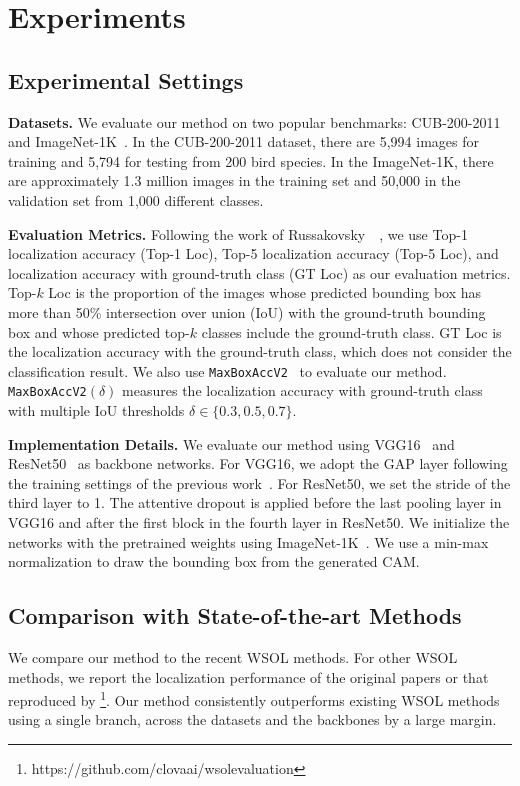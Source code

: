 \section{Experiments}

\subsection{Experimental Settings}
\noindent\textbf{Datasets.}
We evaluate our method on two popular benchmarks: CUB-200-2011~\cite{welinder2010caltech} and ImageNet-1K~\cite{russakovsky2015imagenet}.
In the CUB-200-2011 dataset, there are 5,994 images for training and 5,794 for testing from 200 bird species. In the ImageNet-1K, there are approximately 1.3 million images in the training set and 50,000 in the validation set from 1,000 different classes.

\noindent\textbf{Evaluation Metrics.}
Following the work of Russakovsky~\etal~\cite{russakovsky2015imagenet}, we use Top-1 localization accuracy (Top-1 Loc), Top-5 localization accuracy (Top-5 Loc), and localization accuracy with ground-truth class (GT Loc) as our evaluation metrics.
Top-$k$ Loc is the proportion of the images whose predicted bounding box has more than 50\% intersection over union (IoU) with the ground-truth bounding box and whose predicted top-$k$ classes include the ground-truth class.
GT Loc is the localization accuracy with the ground-truth class, which does not consider the classification result.
We also use \texttt{MaxBoxAccV2}~\cite{choe2020evaluation} to evaluate our method.
\texttt{MaxBoxAccV2}$(\delta)$ measures the localization accuracy with ground-truth class with multiple IoU thresholds $\delta\in\{0.3, 0.5, 0.7\}$.




\noindent\textbf{Implementation Details.}
We evaluate our method using VGG16~\cite{simonyan2014very} and ResNet50~\cite{he2016deep} as backbone networks.
For VGG16, we adopt the GAP layer following the training settings of the previous work~\cite{zhou2016learning}.
For ResNet50, we set the stride of the third layer to 1.
The attentive dropout is applied before the last pooling layer in VGG16 and after the first block in the fourth layer in ResNet50.
We initialize the networks with the pretrained weights using ImageNet-1K~\cite{russakovsky2015imagenet}. We use a min-max normalization to draw the bounding box from the generated CAM.

\subsection{Comparison with State-of-the-art Methods}
We compare our method to the recent WSOL methods. For other WSOL methods, we report the localization performance of the original papers or that reproduced by \cite{choe2020evaluation,kim2021normalization,bae2020rethinking,tan2020dual}\footnote{https://github.com/clovaai/wsolevaluation}. Our method consistently outperforms existing WSOL methods using a single branch, across the datasets and the backbones by a large margin.


